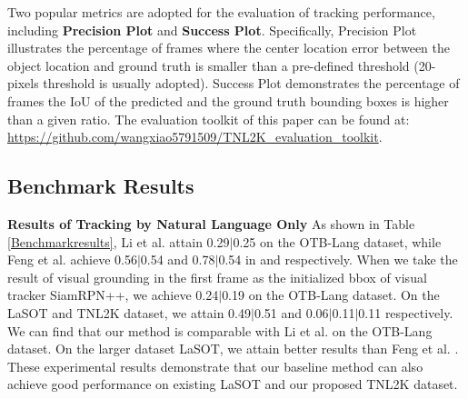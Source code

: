 \documentclass[final]{cvpr}
\begin{document}
Two popular metrics are adopted for the evaluation of tracking performance, including \textbf{Precision Plot} and \textbf{Success Plot}. Specifically, Precision Plot illustrates the percentage of frames where the center location error between the object location and ground truth is smaller than a pre-defined threshold (20-pixels threshold is usually adopted). Success Plot demonstrates the percentage of frames the IoU of the predicted and the ground truth bounding boxes is higher than a given ratio. The evaluation toolkit of this paper can be found at: \url{https://github.com/wangxiao5791509/TNL2K_evaluation_toolkit}. 




\subsection{Benchmark Results} 

\textbf{Results of Tracking by Natural Language Only}
As shown in Table \ref{Benchmarkresults}, Li et al. \cite{li2017tracking} attain 0.29$|$0.25 on the OTB-Lang dataset, while Feng et al. achieve 0.56$|$0.54 and 0.78$|$0.54 in  \cite{feng2020langTrackwacv} and \cite{feng2019robust} respectively. When we take the result of visual grounding in the first frame as the initialized bbox of visual tracker SiamRPN++, we achieve 0.24$|$0.19 on the OTB-Lang dataset. On the LaSOT and TNL2K dataset, we attain 0.49$|$0.51 and 0.06$|$0.11$|$0.11 respectively. We can find that our method is comparable with Li et al. on the OTB-Lang dataset. On the larger dataset LaSOT, we attain better results than Feng et al. \cite{feng2020langTrackwacv}. These experimental results demonstrate that our baseline method can also achieve good performance on existing LaSOT and our proposed TNL2K dataset. 
\end{document}
